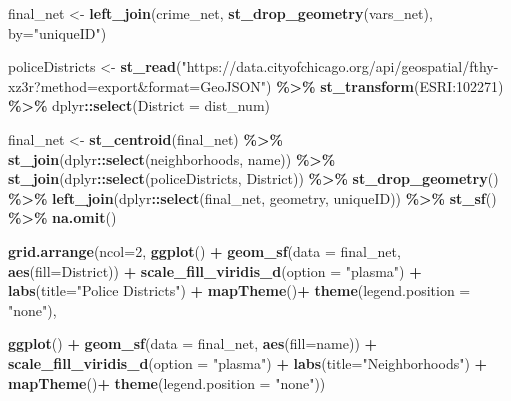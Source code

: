 \documentclass[
]{article}
\newenvironment{Shaded}{\begin{snugshade}}{\end{snugshade}}
\newcommand{\AttributeTok}[1]{\textcolor[rgb]{0.13,0.29,0.53}{#1}}
\newcommand{\DecValTok}[1]{\textcolor[rgb]{0.00,0.00,0.81}{#1}}
\newcommand{\FunctionTok}[1]{\textcolor[rgb]{0.13,0.29,0.53}{\textbf{#1}}}
\newcommand{\NormalTok}[1]{#1}
\newcommand{\OtherTok}[1]{\textcolor[rgb]{0.56,0.35,0.01}{#1}}
\newcommand{\SpecialCharTok}[1]{\textcolor[rgb]{0.81,0.36,0.00}{\textbf{#1}}}
\newcommand{\StringTok}[1]{\textcolor[rgb]{0.31,0.60,0.02}{#1}}
\begin{document}
\begin{Shaded}
\begin{Highlighting}[]
\NormalTok{final\_net }\OtherTok{\textless{}{-}}
  \FunctionTok{left\_join}\NormalTok{(crime\_net, }\FunctionTok{st\_drop\_geometry}\NormalTok{(vars\_net), }\AttributeTok{by=}\StringTok{"uniqueID"}\NormalTok{) }

\NormalTok{policeDistricts }\OtherTok{\textless{}{-}} 
  \FunctionTok{st\_read}\NormalTok{(}\StringTok{"https://data.cityofchicago.org/api/geospatial/fthy{-}xz3r?method=export\&format=GeoJSON"}\NormalTok{) }\SpecialCharTok{\%\textgreater{}\%}
  \FunctionTok{st\_transform}\NormalTok{(}\StringTok{\textquotesingle{}ESRI:102271\textquotesingle{}}\NormalTok{) }\SpecialCharTok{\%\textgreater{}\%}
\NormalTok{  dplyr}\SpecialCharTok{::}\FunctionTok{select}\NormalTok{(}\AttributeTok{District =}\NormalTok{ dist\_num)}

\NormalTok{final\_net }\OtherTok{\textless{}{-}}
  \FunctionTok{st\_centroid}\NormalTok{(final\_net) }\SpecialCharTok{\%\textgreater{}\%}
    \FunctionTok{st\_join}\NormalTok{(dplyr}\SpecialCharTok{::}\FunctionTok{select}\NormalTok{(neighborhoods, name)) }\SpecialCharTok{\%\textgreater{}\%}
    \FunctionTok{st\_join}\NormalTok{(dplyr}\SpecialCharTok{::}\FunctionTok{select}\NormalTok{(policeDistricts, District)) }\SpecialCharTok{\%\textgreater{}\%}
      \FunctionTok{st\_drop\_geometry}\NormalTok{() }\SpecialCharTok{\%\textgreater{}\%}
      \FunctionTok{left\_join}\NormalTok{(dplyr}\SpecialCharTok{::}\FunctionTok{select}\NormalTok{(final\_net, geometry, uniqueID)) }\SpecialCharTok{\%\textgreater{}\%}
      \FunctionTok{st\_sf}\NormalTok{() }\SpecialCharTok{\%\textgreater{}\%}
  \FunctionTok{na.omit}\NormalTok{()}

\FunctionTok{grid.arrange}\NormalTok{(}\AttributeTok{ncol=}\DecValTok{2}\NormalTok{,}
\FunctionTok{ggplot}\NormalTok{() }\SpecialCharTok{+}
      \FunctionTok{geom\_sf}\NormalTok{(}\AttributeTok{data =}\NormalTok{ final\_net, }\FunctionTok{aes}\NormalTok{(}\AttributeTok{fill=}\NormalTok{District)) }\SpecialCharTok{+}
       \FunctionTok{scale\_fill\_viridis\_d}\NormalTok{(}\AttributeTok{option =} \StringTok{"plasma"}\NormalTok{) }\SpecialCharTok{+}
      \FunctionTok{labs}\NormalTok{(}\AttributeTok{title=}\StringTok{"Police Districts"}\NormalTok{) }\SpecialCharTok{+}
      \FunctionTok{mapTheme}\NormalTok{()}\SpecialCharTok{+}
      \FunctionTok{theme}\NormalTok{(}\AttributeTok{legend.position =} \StringTok{"none"}\NormalTok{),}

\FunctionTok{ggplot}\NormalTok{() }\SpecialCharTok{+}
      \FunctionTok{geom\_sf}\NormalTok{(}\AttributeTok{data =}\NormalTok{ final\_net, }\FunctionTok{aes}\NormalTok{(}\AttributeTok{fill=}\NormalTok{name)) }\SpecialCharTok{+}
       \FunctionTok{scale\_fill\_viridis\_d}\NormalTok{(}\AttributeTok{option =} \StringTok{"plasma"}\NormalTok{) }\SpecialCharTok{+}
      \FunctionTok{labs}\NormalTok{(}\AttributeTok{title=}\StringTok{"Neighborhoods"}\NormalTok{) }\SpecialCharTok{+}
      \FunctionTok{mapTheme}\NormalTok{()}\SpecialCharTok{+}
      \FunctionTok{theme}\NormalTok{(}\AttributeTok{legend.position =} \StringTok{"none"}\NormalTok{))}
\end{Highlighting}
\end{Shaded}
\end{document}
